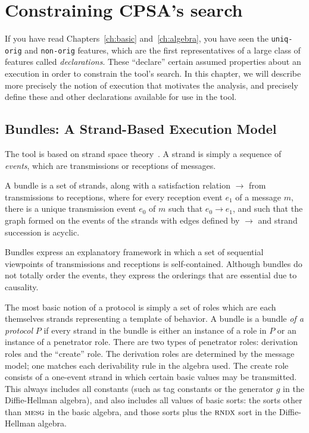 \chapter{Constraining CPSA's search}
\label{ch:declarations}

If you have read Chapters~\ref{ch:basic} and~\ref{ch:algebra}, you
have seen the \texttt{uniq-orig} and \texttt{non-orig} features, which
are the first representatives of a large class of features called
\emph{declarations}.  These ``declare'' certain assumed properties about
an execution in order to constrain the tool's search.  In this chapter,
we will describe more precisely the notion of execution that motivates
the {\cpsa} analysis, and precisely define these and other declarations
available for use in the tool.

\section{Bundles: A Strand-Based Execution Model}
\label{sec:bundles}

  The {\cpsa} tool is based on
strand space theory~\cite{DoghmiGuttmanThayer07}.  A strand is simply
a sequence of \emph{events}, which are transmissions or receptions of
messages.

A bundle is a set of strands, along with a satisfaction relation
$\rightarrow$ from transmissions to receptions, where for every
reception event $e_1$ of a message $m$, there is a unique transmission
event $e_0$ of $m$ such that $e_0 \rightarrow e_1$, and such that the
graph formed on the events of the strands with edges defined by
$\rightarrow$ and strand succession is acyclic.

Bundles express an explanatory framework in which a set of sequential
viewpoints of transmissions and receptions is self-contained.  Although
bundles do not totally order the events, they express the orderings that
are essential due to causality.

The most basic notion of a protocol is simply a set of roles which are
each themselves strands representing a template of behavior.  A bundle
is a bundle \emph{of a protocol} $P$ if every strand in the bundle is
either an instance of a role in $P$ or an instance of a penetrator
role.  There are two types of penetrator roles: derivation roles and
the ``create'' role.  The derivation roles are determined by the
message model; one matches each derivability rule in the algebra used.
The create role consists of a one-event strand in which certain basic
values may be transmitted.  This always includes all constants (such
as tag constants or the generator $g$ in the Diffie-Hellman algebra),
and also includes all values of basic sorts: the sorts other than
$\scap{mesg}$ in the basic algebra, and those sorts plus the
$\scap{rndx}$ sort in the Diffie-Hellman algebra.

